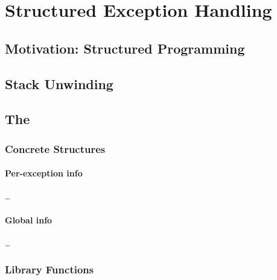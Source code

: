 
\section{Structured Exception Handling}\label{se:structured_exceptions}

\subsection{Motivation: Structured Programming}

\subsection{Stack Unwinding}

\subsection{The \texorpdfstring{} \acs*{abi}}

\subsubsection{Concrete Structures}

\paragraph{Per-exception info}
\todo\dots
\paragraph{Global info}
\todo\dots

\subsubsection{Library Functions}

